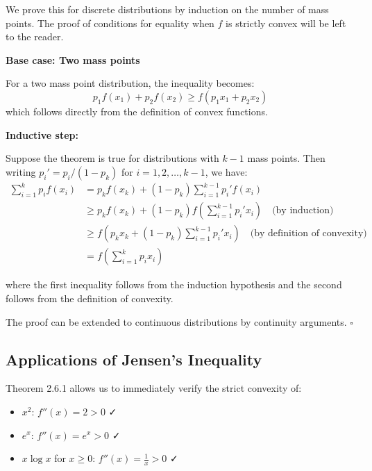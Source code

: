 \documentclass[11pt,a4paper]{book}
\newenvironment{formulabox}[1][Formula]{
    \begin{tcolorbox}[
        enhanced,
        breakable,
        colback=softcoral!10,
        colframe=softcoral!200,
        title=#1,
        fonttitle=\bfseries,
        coltitle=white,
        sharp corners,
        boxrule=1pt,
        left=8pt,
        right=8pt,
        top=6pt,
        bottom=6pt
    ]
}{
    \end{tcolorbox}
}
\newenvironment{infobox}[1][For more understanding]{
    \begin{tcolorbox}[
        enhanced,
        breakable,
        colback=mintgreen!10,
        colframe=mintgreen!200,
        title=#1,
        fonttitle=\bfseries,
        sharp corners,
        boxrule=0.8pt,
        left=8pt,
        right=8pt,
        top=6pt,
        bottom=6pt
    ]
}{
    \end{tcolorbox}
}
\newenvironment{derivationbox}[1][Derivation]{
    \begin{tcolorbox}[
        enhanced,
        breakable,
        colback=softpeach!10,
        colframe=softpeach!200,
        title=#1,
        fonttitle=\bfseries,
        sharp corners,
        boxrule=0.8pt,
        left=10pt,
        right=10pt,
        top=8pt,
        bottom=8pt
    ]
}{
    \end{tcolorbox}
}
\begin{document}
\begin{formulabox}[General Conditional Chain Rule]
\begin{derivationbox}[Proof of Jensen's Inequality]
    We prove this for discrete distributions by induction on the number of mass points. The proof of conditions for equality when \(f\) is strictly convex will be left to the reader.
    
    \textbf{Base case: Two mass points}
    
    For a two mass point distribution, the inequality becomes:
    \[
    p_1 f(x_1) + p_2 f(x_2) \geq f(p_1 x_1 + p_2 x_2)
    \]
    which follows directly from the definition of convex functions.
    
    \textbf{Inductive step:}
    
    Suppose the theorem is true for distributions with \(k-1\) mass points. Then writing \(p_i' = p_i/(1-p_k)\) for \(i = 1, 2, \ldots, k-1\), we have:
    \begin{align*}
    \sum_{i=1}^{k} p_i f(x_i) &= p_k f(x_k) + (1-p_k) \sum_{i=1}^{k-1} p_i' f(x_i) \\
    &\geq p_k f(x_k) + (1-p_k) f\left(\sum_{i=1}^{k-1} p_i' x_i\right) \quad \text{(by induction)} \\
    &\geq f\left(p_k x_k + (1-p_k) \sum_{i=1}^{k-1} p_i' x_i\right) \quad \text{(by definition of convexity)} \\
    &= f\left(\sum_{i=1}^{k} p_i x_i\right)
    \end{align*}
    
    where the first inequality follows from the induction hypothesis and the second follows from the definition of convexity.
    
    The proof can be extended to continuous distributions by continuity arguments. \(\square\)
\end{derivationbox}

\subsection{Applications of Jensen's Inequality}

\begin{infobox}[Verification of Convexity]
    Theorem 2.6.1 allows us to immediately verify the strict convexity of:
    \begin{itemize}
        \item \(x^2\): \(f''(x) = 2 > 0\) ✓
        \item \(e^x\): \(f''(x) = e^x > 0\) ✓
        \item \(x \log x\) for \(x \geq 0\): \(f''(x) = \frac{1}{x} > 0\) ✓
    \end{itemize}
    

\end{infobox}
\end{formulabox}
\end{document}
